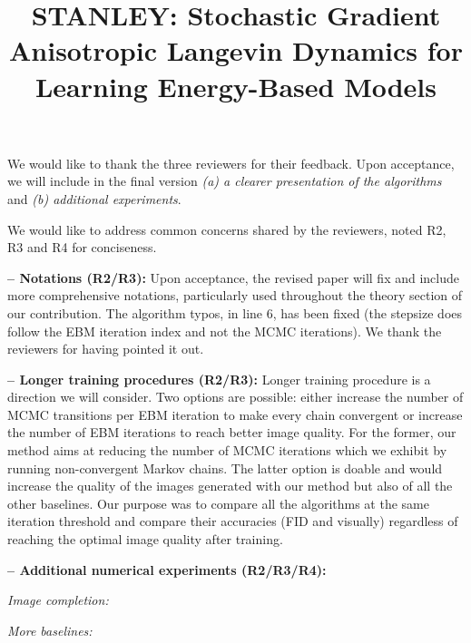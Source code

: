 \documentclass[10pt,twocolumn,letterpaper]{article}
\begin{document}
\title{STANLEY: Stochastic Gradient Anisotropic Langevin Dynamics for Learning Energy-Based Models}  %

\maketitle
\thispagestyle{empty}



We would like to thank the three reviewers for their feedback. 
Upon acceptance, we will include in the final version \emph{{\sf (a)} a clearer presentation of the algorithms} and \emph{{\sf (b)} additional experiments}. 


We would like to address common concerns shared by the reviewers, noted R2, R3 and R4 for conciseness.

\noindent  \textbf{-- Notations (R2/R3):}
Upon acceptance, the revised paper will fix and include more comprehensive notations, particularly used throughout the theory section of our contribution.
The algorithm typos, in line 6, has been fixed (the stepsize does follow the EBM iteration index and not the MCMC iterations). We thank the reviewers for having pointed it out.

\noindent \textbf{-- Longer training procedures (R2/R3):}
Longer training procedure is a direction we will consider. 
Two options are possible: either increase the number of MCMC transitions per EBM iteration to make every chain convergent or increase the number of EBM iterations to reach better image quality.
For the former, our method aims at reducing the number of MCMC iterations which we exhibit by running non-convergent Markov chains. 
The latter option is doable and would increase the quality of the images generated with our method but also of all the other baselines.
Our purpose was to compare all the algorithms at the same iteration threshold and compare their accuracies (FID and visually) regardless of reaching the optimal image quality after training.


\noindent \textbf{-- Additional numerical experiments (R2/R3/R4):}


\textit{Image completion:}


\textit{More baselines:}
\end{document}
